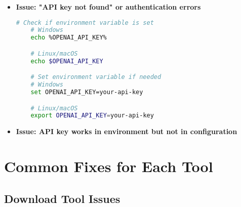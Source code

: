 \begin{itemize}
    \item \textbf{Issue: "API key not found" or authentication errors}

    \begin{commandbox}
    \begin{lstlisting}[language=Bash]
    # Check if environment variable is set
    # Windows
    echo %OPENAI_API_KEY%

    # Linux/macOS
    echo $OPENAI_API_KEY

    # Set environment variable if needed
    # Windows
    set OPENAI_API_KEY=your-api-key

    # Linux/macOS
    export OPENAI_API_KEY=your-api-key
    \end{lstlisting}
    \end{commandbox}

    \item \textbf{Issue: API key works in environment but not in configuration}

\end{itemize}

\section{Common Fixes for Each Tool}

\subsection{Download Tool Issues}


